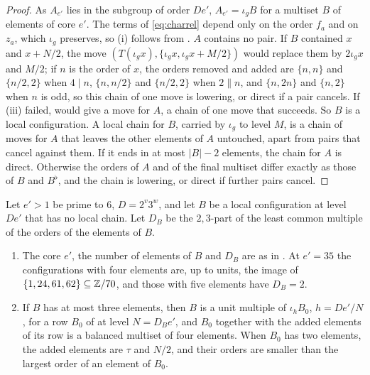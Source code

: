 \begin{proof}
As $A_{e'}$ lies in the subgroup of order $De'$, $A_{e'}=\iota_{g}B$ for a
multiset $B$ of elements of core $e'$. The terms of \eqref{eq:charrel}
depend only on the order $f_{a}$ and on $z_{a}$, which $\iota_{g}$
preserves, so (i) follows from . $A$ contains no pair. If
$B$ contained $x$ and $x+N/2$, the move $(T(\iota_{g}x),\{\iota_{g}x,
\iota_{g}x+M/2\})$ would replace them by $2\iota_{g}x$ and $M/2$; if $n$ is
the order of $x$, the orders removed and added are $\{n,n\}$ and $\{n/2,2\}$
when $4\mid n$, $\{n,n/2\}$ and $\{n/2,2\}$ when $2\parallel n$, and
$\{n,2n\}$ and $\{n,2\}$ when $n$ is odd, so this chain of one move is
lowering, or direct if a pair cancels. If (iii) failed, 
would give a move for $A$, a chain of one move that succeeds. So $B$ is a
local configuration. A local chain for $B$, carried by $\iota_{g}$ to level
$M$, is a chain of moves for $A$ that leaves the other elements of $A$
untouched, apart from pairs that cancel against them. If it ends in at most
$|B|-2$ elements, the chain for $A$ is direct. Otherwise the orders of $A$
and of the final multiset differ exactly as those of $B$ and $B^{\flat}$, and
the chain is lowering, or direct if further pairs cancel.
\end{proof}

\begin{hypothesis}\label{hyp:local}
Let $e'>1$ be prime to $6$, $D=2^{v}3^{w}$, and let $B$ be a local
configuration at level $De'$ that has no local chain. Let $D_{B}$ be the
$2,3$-part of the least common multiple of the orders of the elements of $B$.
\begin{enumerate}[label=\textup{(\alph*)}]
\item The core $e'$, the number of elements of $B$ and $D_{B}$ are as in
. At $e'=35$ the configurations with four elements are,
up to units, the image of $\{1,24,61,62\}\subseteq\mathbb{Z}/70$, and those with
five elements have $D_{B}=2$.
\item If $B$ has at most three elements, then $B$ is a unit multiple of
$\iota_{h}B_{0}$, $h=De'/N$, for a row $B_{0}$ of  at level
$N=D_{B}e'$, and $B_{0}$ together with the added elements of its row is a
balanced multiset of four elements. When $B_{0}$ has two elements, the added
elements are $\tau$ and $N/2$, and their orders are smaller than the largest
order of an element of $B_{0}$.
\end{enumerate}
\end{hypothesis}

